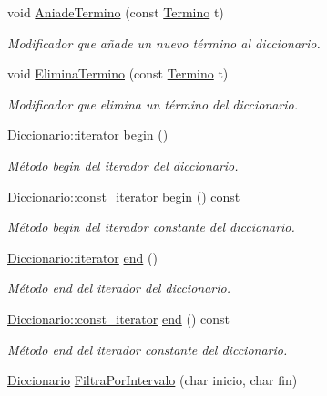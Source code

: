 \begin{DoxyCompactItemize}
void \hyperlink{classDiccionario_a95512d5b0735da4a1dc53aa3cd97f730}{Aniade\+Termino} (const \hyperlink{classTermino}{Termino} t)
\begin{DoxyCompactList}\small\item\em Modificador que añade un nuevo término al diccionario. \end{DoxyCompactList}\item 
void \hyperlink{classDiccionario_a78522832460a1949dcf60e902b5cd950}{Elimina\+Termino} (const \hyperlink{classTermino}{Termino} t)
\begin{DoxyCompactList}\small\item\em Modificador que elimina un término del diccionario. \end{DoxyCompactList}\item 
\hyperlink{classDiccionario_a91820df8d3ba094a119e4ad5af589156}{Diccionario\+::iterator} \hyperlink{classDiccionario_ab270eb969d580f01b358e648a3061ac4}{begin} ()
\begin{DoxyCompactList}\small\item\em Método begin del iterador del diccionario. \end{DoxyCompactList}\item 
\hyperlink{classDiccionario_a2e86a5840e62eab4f1499c2f23561cba}{Diccionario\+::const\+\_\+iterator} \hyperlink{classDiccionario_a5196245f1d267b0ddb9350dfa8f33b2c}{begin} () const
\begin{DoxyCompactList}\small\item\em Método begin del iterador constante del diccionario. \end{DoxyCompactList}\item 
\hyperlink{classDiccionario_a91820df8d3ba094a119e4ad5af589156}{Diccionario\+::iterator} \hyperlink{classDiccionario_a7de585de002dfdec241b645bc57a3d0a}{end} ()
\begin{DoxyCompactList}\small\item\em Método end del iterador del diccionario. \end{DoxyCompactList}\item 
\hyperlink{classDiccionario_a2e86a5840e62eab4f1499c2f23561cba}{Diccionario\+::const\+\_\+iterator} \hyperlink{classDiccionario_a8161ae4e92a33e516bf73741e8299846}{end} () const
\begin{DoxyCompactList}\small\item\em Método end del iterador constante del diccionario. \end{DoxyCompactList}\item 
\hyperlink{classDiccionario}{Diccionario} \hyperlink{classDiccionario_a0b6e19ef8a378f77d9411e4a873a1d76}{Filtra\+Por\+Intervalo} (char inicio, char fin)

\end{DoxyCompactItemize}
